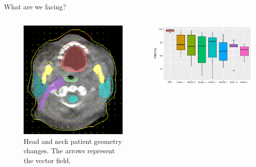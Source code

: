 \begin{frame}[c]{What are we facing?}
    \begin{columns}[c]
        \begin{figure}[h]
            \centering
            \includegraphics[width=\textwidth]{imgs/patient_deformation.png}
            \caption{Head and neck patient geometry changes. The arrows represent the vector field.}
        \end{figure}
        \includegraphics[width=\textwidth]{imgs/plan_evolution_V98.pdf}\\

\end{columns}
\end{frame}
